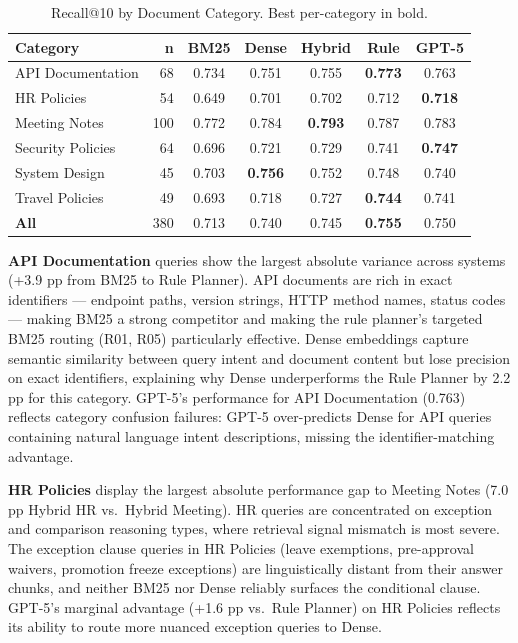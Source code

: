 \documentclass[11pt, a4paper]{article}
\begin{document}
\begin{table}[htbp]
\centering
\caption{Recall@10 by Document Category. Best per-category in bold.}
\label{tab:category}
\begin{tabular}{lrccccc}
\toprule
\textbf{Category} & \textbf{n} & \textbf{BM25} & \textbf{Dense} & \textbf{Hybrid} & \textbf{Rule} & \textbf{GPT-5} \\
\midrule
API Documentation   & 68  & 0.734 & 0.751 & 0.755 & \textbf{0.773} & 0.763 \\
HR Policies         & 54  & 0.649 & 0.701 & 0.702 & 0.712 & \textbf{0.718} \\
Meeting Notes       & 100 & 0.772 & 0.784 & \textbf{0.793} & 0.787 & 0.783 \\
Security Policies   & 64  & 0.696 & 0.721 & 0.729 & 0.741 & \textbf{0.747} \\
System Design       & 45  & 0.703 & \textbf{0.756} & 0.752 & 0.748 & 0.740 \\
Travel Policies     & 49  & 0.693 & 0.718 & 0.727 & \textbf{0.744} & 0.741 \\
\midrule
\textbf{All}        & 380 & 0.713 & 0.740 & 0.745 & \textbf{0.755} & 0.750 \\
\bottomrule
\end{tabular}
\end{table}

\textbf{API Documentation} queries show the largest absolute variance across systems (+3.9 pp from BM25 to Rule Planner). API documents are rich in exact identifiers --- endpoint paths, version strings, HTTP method names, status codes --- making BM25 a strong competitor and making the rule planner's targeted BM25 routing (R01, R05) particularly effective. Dense embeddings capture semantic similarity between query intent and document content but lose precision on exact identifiers, explaining why Dense underperforms the Rule Planner by 2.2 pp for this category. GPT-5's performance for API Documentation (0.763) reflects category confusion failures: GPT-5 over-predicts Dense for API queries containing natural language intent descriptions, missing the identifier-matching advantage.

\textbf{HR Policies} display the largest absolute performance gap to Meeting Notes (7.0 pp Hybrid HR vs.\ Hybrid Meeting). HR queries are concentrated on exception and comparison reasoning types, where retrieval signal mismatch is most severe. The exception clause queries in HR Policies (leave exemptions, pre-approval waivers, promotion freeze exceptions) are linguistically distant from their answer chunks, and neither BM25 nor Dense reliably surfaces the conditional clause. GPT-5's marginal advantage (+1.6 pp vs.\ Rule Planner) on HR Policies reflects its ability to route more nuanced exception queries to Dense.
\end{document}
